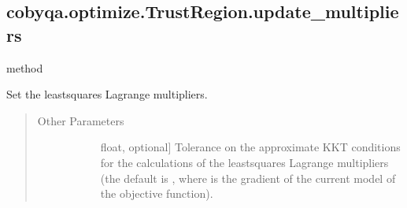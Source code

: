 \documentclass[letterpaper,10pt,english]{sphinxmanual}
\begin{document}
\begin{fulllineitems}
\begin{fulllineitems}
\begin{quote}
\begin{description}
\begin{description}
\end{description}

\end{description}\end{quote}

\end{fulllineitems}



\subsection{cobyqa.optimize.TrustRegion.update\_multipliers}
\label{\detokenize{refs/generated/cobyqa.optimize.TrustRegion.update_multipliers:cobyqa-optimize-trustregion-update-multipliers}}\label{\detokenize{refs/generated/cobyqa.optimize.TrustRegion.update_multipliers::doc}}
\sphinxAtStartPar
method

\begin{fulllineitems}
\label{\detokenize{refs/generated/cobyqa.optimize.TrustRegion.update_multipliers:cobyqa.optimize.TrustRegion.update_multipliers}}
\sphinxAtStartPar
Set the least\sphinxhyphen{}squares Lagrange multipliers.
\begin{quote}\begin{description}
\item[{Other Parameters}] \leavevmode\begin{description}
\item[{}] \leavevmode{[}float, optional{]}
\sphinxAtStartPar
Tolerance on the approximate KKT conditions for the calculations of
the least\sphinxhyphen{}squares Lagrange multipliers (the default is
, where  is the
gradient of the current model of the objective function).

\end{description}

\end{description}\end{quote}

\end{fulllineitems}




\end{fulllineitems}
\end{document}
